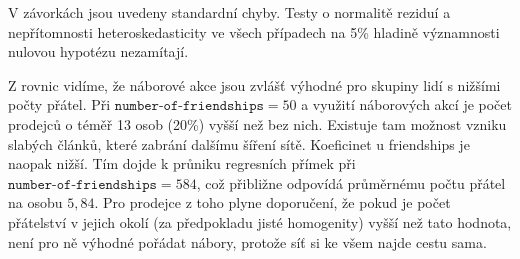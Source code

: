 \documentclass[a4wide,12pt]{report}
\begin{document}
V závorkách jsou uvedeny standardní chyby. Testy o normalitě reziduí a nepřítomnosti heteroskedasticity ve všech případech na 5\% hladině významnosti nulovou hypotézu nezamítají.

Z rovnic vidíme, že náborové akce jsou zvlášť výhodné pro skupiny lidí s nižšími počty přátel. Při $\texttt{number-of-friendships}=50$ a využití náborových akcí je počet prodejců o téměř 13 osob (20\%) vyšší než bez nich.
Existuje tam možnost vzniku slabých článků, které zabrání dalšímu šíření sítě. Koeficinet u friendships je naopak nižší. Tím dojde k průniku regresních přímek při $\texttt{number-of-friendships}=584$, což přibližne odpovídá průměrnému počtu přátel na osobu $5,84$. Pro prodejce z toho plyne doporučení, že pokud je počet přátelství v jejich okolí (za předpokladu jisté homogenity) vyšší než tato hodnota, není pro ně výhodné pořádat nábory, protože síť si ke všem najde cestu sama.
\end{document}
